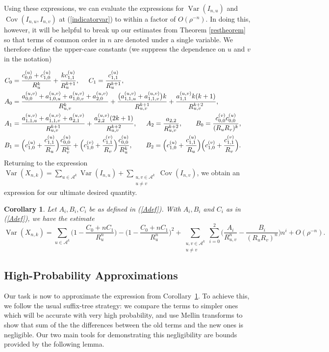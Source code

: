 \documentclass[proceedings]{aofa}
\newtheorem{corollary}{Corollary}
\def\Var{\mathop{\operatorname{Var}}}
\def\Cov{\mathop{\operatorname{Cov}}}
\newcommand{\Iu}{I_{n,u}}
\newcommand{\Iv}{I_{n,v}}
\newcommand{\sumu}{\sum_{u\in\Ak}}
\newcommand{\Ak}{\mathcal{A}^{k}}
\newcommand{\sumuv}{\sum_{\substack{u,v\in\Ak \\ u \neq v}}}
\def\Cov{\mathop{\operatorname{Cov}}}
\newcommand{\Xnk}{X_{n,k}}
\newcommand{\RuRv}{(\Ru\Rv)}
\newcommand{\Ru}{R_{u}}
\newcommand{\Rv}{R_{v}}
\newcommand{\Ruv}{R_{u,v}}
\begin{document}
Using these expressions, we can evaluate the expressions for
$\Var(\Iu)$ and $\Cov(\Iu,\Iv)$ at (\ref{indicatorvar}) to within a
factor of $O(\rho^{-n})$. In doing this, however, it will be helpful
to break up our estimates from Theorem \ref{restheorem} so that terms
of common order in $n$ are denoted under a single variable. We
therefore define the upper-case constants (we suppress the dependence
on $u$ and $v$ in the notation)

\begin{align}
C_{0}&=\frac{c_{0,0}^{(u)}+c_{1,0}^{(u)}}{\Ru^{k}} + \frac{k
  c_{1,1}^{(u)}}{\Ru^{k+1}},\;\;\;\;\;C_{1}=\frac{c_{1,1}^{(u)}}{\Ru^{k+1}},
\notag\\
A_{0} &= \frac{a_{0,0}^{(u,v)}+a_{1,0,u}^{(u,v)}+a_{1,0,v}^{(u,v)}+a_{2,0}^{(u,v)}}{\Ruv^{k}}+\frac{\big(a_{1,1,u}^{(u,v)}+a_{1,1,v}^{(u,v)}\big)k}{\Ruv^{k+1}}+\frac{a_{1,1}^{(u,v)}k(k+1)}{\Ruv^{k+2}},\notag\\
A_{1} &= \frac{a_{1,1,u}^{(u,v)}+a_{1,1,v}^{(u,v)}+a_{2,1}^{(u,v)}}{\Ruv^{k+1}}+\frac{a_{2,2}^{(u,v)}(2k+1)}{\Ruv^{k+2}},\;\;\;\;\; A_{2}=\frac{a_{2,2}}{\Ruv^{k+2}},
\qquad B_{0}=\frac{c_{0,0}^{(v)}c_{0,0}^{(u)}}{\RuRv^{k}},\;\;\;\;\;\notag\\
B_{1}&=\Big(c_{1,0}^{(u)}+\frac{c_{1,1}^{(u)}}{\Ru}\Big)\frac{c_{0,0}^{(u)}}{\Rv^{k}}+\Big(c_{1,0}^{(v)}+\frac{c_{1,1}^{(v)}}{\Rv}\Big)\frac{c_{0,0}^{(u)}}{\Ru^{k}},
\qquad B_{2}= \Big(c_{1,0}^{(u)}+\frac{c_{1,1}^{(u)}}{\Ru}\Big)\Big(c_{1,0}^{(v)}+\frac{c_{1,1}^{(v)}}{\Rv}\Big).\label{Adef}
\end{align}
Returning to the expression $\Var(X_{n,k})=\sumu \Var(\Iu) + \sumuv \Cov(\Iv)$, we obtain an expression for our ultimate desired quantity.
\begin{corollary}\label{Acorr}
Let $A_{i},B_{i},C_{i}$ be as defined in (\ref{Adef}). 
With $A_{i},B_{i}$ and $C_{i}$ as in (\ref{Adef}),
we have the estimate
\begin{equation*}
\Var(\Xnk)= \sumu \Big(1-\frac{C_{0}+nC_{1}}{\Ru^{n}}\Big)- \Big(1-\frac{C_{0}+nC_{1}}{\Ru^{n}}\Big)^{2}
+\sumuv\sum_{i=0}^{2} \Big(\frac{A_{i}}{\Ruv^{n}} - \frac{ B_{i}}{\RuRv^{n}}\Big)n^{i} + O(\rho^{-n}).
\end{equation*}
\end{corollary}


\subsection{High-Probability Approximations}
Our task is now to approximate the expression from Corollary~\ref{Acorr}. To achieve this, we follow the usual suffix-tree strategy: we compare the terms to simpler ones which will be accurate with very high probability, and use Mellin transforms to show that sum of the the differences between the old terms and the new ones is negligible. Our two main tools for demonstrating this negligibility are bounds provided by the following lemma.
\end{document}
